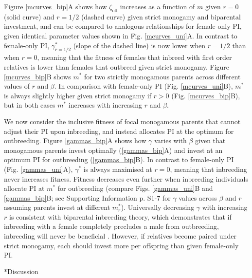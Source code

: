 \documentclass[12pt]{article}
\makeatletter
\renewcommand\section{\@startsection{section}{1}{0in}{-0.5\baselineskip}{0.1\baselineskip}{\normalfont\large\bfseries}}
\makeatother
\begin{document}
Figure \ref{mcurves_bip}A shows how $\zeta_{\textrm{off}}$ increases as a function of $m$ given $r=0$ (solid curve) and $r=1/2$ (dashed curve) given strict monogamy and biparental investment, and can be compared to analogous relationships for female-only PI, given identical parameter values shown in Fig. \ref{mcurves_uni}A. In contrast to female-only PI, $\gamma^{*}_{r=1/2}$ (slope of the dashed line) is now lower when $r=1/2$ than when $r=0$, meaning that the fitness of females that inbreed with first order relatives is lower than females that outbreed given strict monogamy. Figure \ref{mcurves_bip}B shows $m^{*}$ for two strictly monogamous parents across different values of $r$ and $\beta$. In comparison with female-only PI (Fig. \ref{mcurves_uni}B), $m^{*}$ is always slightly higher given strict monogamy if $r>0$ (Fig. \ref{mcurves_bip}B), but in both cases $m^{*}$ increases with increasing $r$ and $\beta$. 

We now consider the inclusive fitness of focal monogamous parents that cannot adjust their PI upon inbreeding, and instead allocates PI at the optimum for outbreeding. Figure \ref{gammas_bip}A shows how $\gamma$ varies with $\beta$ given that monogamous parents invest optimally (\ref{gammas_bip}A) and invest at an optimum PI for outbreeding (\ref{gammas_bip}B). In contrast to female-only PI (Fig. \ref{gammas_uni}A), $\gamma^{*}$ is always maximised at $r=0$, meaning that inbreeding never increases fitness. Fitness decreases even further when inbreeding individuals allocate PI at $m^{*}$ for outbreeding (compare Figs. \ref{gammas_uni}B and \ref{gammas_bip}B; see Supporting Information p. S1-7 for $\gamma$ values across $\beta$ and $r$ assuming parents invest at different $m^{*}_{r}$). Universally decreasing $\gamma$ with increasing $r$ is consistent with biparental inbreeding theory, which demonstrates that if inbreeding with a female completely precludes a male from outbreeding, inbreeding will never be beneficial \cite[][]{Waser1986, Duthie2015a}. However, if relatives become paired under strict monogamy, each should invest more per offspring than given female-only PI.

\section*{Discussion}
\end{document}
